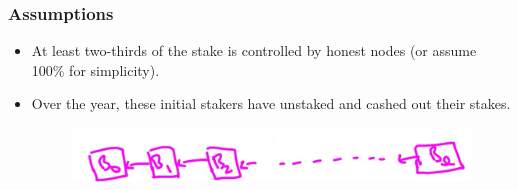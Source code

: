 \subsubsection{Assumptions}
\begin{itemize}
    \item At least two-thirds of the stake is controlled by honest nodes (or assume 100\% for simplicity).
    \item Over the year, these initial stakers have unstaked and cashed out their stakes.
    \begin{figure}[h]
    \centering
    \includegraphics[scale = 0.5]{figures/f58.png}
    \caption{}
    \label{fig:mesh1}
    \end{figure}\\
\end{itemize}

